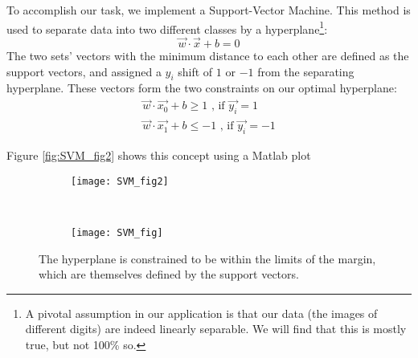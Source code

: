 %
%

To accomplish our task, we implement a Support-Vector Machine. This method is used to separate data into two different classes by a hyperplane\footnote{A pivotal assumption in our application is that our data (the images of different digits) are indeed linearly separable. We will find that this is mostly true, but not 100\% so.}:
\begin{equation}
\vec{w}\cdot\vec{x} + b = 0
\end{equation}
The two sets' vectors with the minimum distance to each other are defined as the support vectors, and assigned a $y_{i}$ shift of $1$ or $-1$ from the separating hyperplane. These vectors form the two constraints on our optimal hyperplane:
\begin{equation}
\begin{gathered}
	\vec{w}\cdot\vec{x_0} + b \geq 1 \text{ , if } \vec{y_i} = 1 \\
	\vec{w}\cdot\vec{x_1} + b \leq -1 \text{ , if } \vec{y_i} = -1 
\end{gathered}
\end{equation}

Figure \ref{fig:SVM_fig2} shows this concept using a Matlab plot

\begin{figure*}[t]
	\begin{subfigure}[t]{0.5\textwidth}
		\texttt{[image: SVM\_fig2]}
		\caption{}
		\centering
		\label{fig:SVM_fig_a}
	\end{subfigure}%
	~
	\begin{subfigure}[t]{0.5\textwidth}
		\texttt{[image: SVM\_fig]}
		\caption{}
		\centering
		\label{fig:SVM_fig_b}
	\end{subfigure}%
	
	\caption{The hyperplane is constrained to be within the limits of the margin, which are themselves defined by the support vectors.}
	\label{fig:SVM_fig}
\end{figure*}

